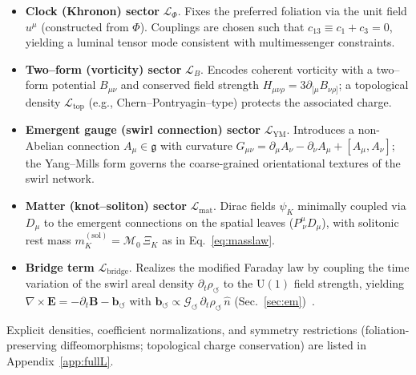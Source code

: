 \documentclass[10pt,reprint,aps,onecolumn,nofootinbib]{revtex4-2}
\newcommand{\vect}[1]{\boldsymbol{#1}} %
\begin{document}
        \begin{itemize}
            \item \textbf{Clock (Khronon) sector} \(\mathcal{L}_\Phi\).\; Fixes the preferred foliation via the unit field \(u^\mu\) (constructed from \(\Phi\)). Couplings are chosen such that \(c_{13}\equiv c_1+c_3=0\), yielding a luminal tensor mode consistent with multimessenger constraints.

            \item \textbf{Two–form (vorticity) sector} \(\mathcal{L}_B\).\; Encodes coherent vorticity with a two–form potential \(B_{\mu\nu}\) and conserved field strength \(H_{\mu\nu\rho}=3\partial_{[\mu}B_{\nu\rho]}\); a topological density \(\mathcal{L}_{\mathrm{top}}\) (e.g., Chern–Pontryagin–type) protects the associated charge.

            \item \textbf{Emergent gauge (swirl connection) sector} \(\mathcal{L}_{\mathrm{YM}}\).\; Introduces a non-Abelian connection \(A_\mu\in\mathfrak{g}\) with curvature
            \(G_{\mu\nu}=\partial_\mu A_\nu-\partial_\nu A_\mu+[A_\mu,A_\nu]\); the Yang–Mills form governs the coarse-grained orientational textures of the swirl network.

            \item \textbf{Matter (knot–soliton) sector} \(\mathcal{L}_{\mathrm{mat}}\).\; Dirac fields \(\psi_K\) minimally coupled via \(D_\mu\) to the emergent connections on the spatial leaves (\(P^\mu_{\ \nu}D_\mu\)), with solitonic rest mass  \(m_K^{(\mathrm{sol})}=\mathcal{M}_0\,\Xi_K\) as in Eq.~\eqref{eq:masslaw}. ~\cite{MantonSutcliffe2004,Skyrme1962}

            \item \textbf{Bridge term} \(\mathcal{L}_{\mathrm{bridge}}\).\; Realizes the modified Faraday law by coupling the time variation of the swirl areal density \(\partial_t\rho_{\circlearrowleft}\) to the \(\mathrm{U}(1)\) field strength, yielding
            \(\nabla\times \vect{E}=-\partial_t \vect{B}-\vect{b}_{\circlearrowleft}\) with
            \(\vect{b}_{\circlearrowleft}\propto \mathcal{G}_{\circlearrowleft}\,\partial_t\rho_{\circlearrowleft}\,\hat n\) (Sec.~\ref{sec:em})~\cite{EM_G}.
        \end{itemize}

        Explicit densities, coefficient normalizations, and symmetry restrictions (foliation-preserving diffeomorphisms; topological charge conservation) are listed in Appendix~\ref{app:fullL}.
\end{document}
